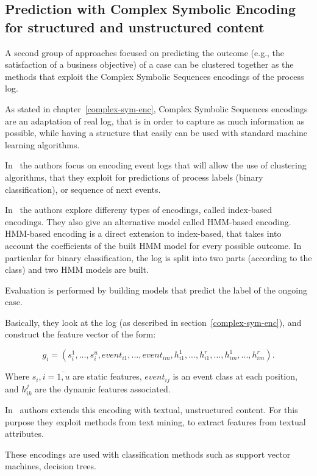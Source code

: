 \subsection{Prediction with Complex Symbolic Encoding for structured and unstructured content}

A second group of approaches focused on predicting the outcome (e.g., the satisfaction of a business objective) of a case can be clustered together as the methods that exploit the Complex Symbolic Sequences encodings of the process log.

As stated in chapter~\ref{complex-sym-enc}, Complex Symbolic Sequences encodings are an adaptation of real log, that is in order to capture as much information as possible, while having a structure that easily can be used with standard machine learning algorithms.

In~\cite{Leontjeva2015} the authors focus on encoding event logs that will allow the use of clustering algorithms, that they exploit for predictions of process labels (binary classification), or sequence of next events.

In~\cite{Leontjeva2015} the authors explore differeny types of encodings, called index-based encodings. They also give an alternative model called HMM-based encoding. HMM-based encoding is a direct extension to index-based, that takes into account the coefficients of the built HMM model for every possible outcome. In particular for binary classification, the log is split into two parts (according to the class) and two HMM models are built.

Evaluation is performed by building models that predict the label of the ongoing case.

Basically, they look at the log (as described in section~\ref{complex-sym-enc}), and construct the feature vector of the form:

\[g_i = (s_i^1,...,s_i^u,event_{i1},...,event_{im},h_{i1}^1,...,h_{i1}^r,...,h_{im}^1,...,h_{im}^r).\]

Where $s_i, i=\overline{1,u}$ are static features, $event_{ij}$ is an event class at each position, and $h_{ik}^{j}$ are the dynamic features associated. 

In~\cite{DBLP:conf/bpm/TeinemaaDMF16} authors extends this encoding with textual, unstructured content. For this purpose they exploit methods from text mining, to extract features from textual attributes.


These encodings are used with classification methods such as support vector machines, decision trees. 

